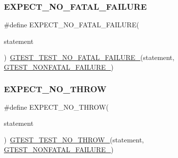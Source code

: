 \subsubsection{\texorpdfstring{EXPECT\_NO\_FATAL\_FAILURE}{EXPECT\_NO\_FATAL\_FAILURE}}
{\footnotesize\ttfamily \#define E\+X\+P\+E\+C\+T\+\_\+\+N\+O\+\_\+\+F\+A\+T\+A\+L\+\_\+\+F\+A\+I\+L\+U\+RE(\begin{DoxyParamCaption}\item[{}]{statement }\end{DoxyParamCaption})~\mbox{\hyperlink{_obj__test_2lib_2googletest-release-1_88_81_2googletest_2include_2gtest_2internal_2gtest-internal_8h_a1b37a3c446836d33040f3266a6236081}{G\+T\+E\+S\+T\+\_\+\+T\+E\+S\+T\+\_\+\+N\+O\+\_\+\+F\+A\+T\+A\+L\+\_\+\+F\+A\+I\+L\+U\+R\+E\+\_\+}}(statement, \mbox{\hyperlink{_obj__test_2lib_2googletest-release-1_88_81_2googletest_2include_2gtest_2internal_2gtest-internal_8h_a6cb7482cfa03661a91c698eb5895f642}{G\+T\+E\+S\+T\+\_\+\+N\+O\+N\+F\+A\+T\+A\+L\+\_\+\+F\+A\+I\+L\+U\+R\+E\+\_\+}})}

\mbox{\label{_obj__test_2lib_2googletest-master_2googletest_2include_2gtest_2gtest_8h_a2743a1438137ad857aa3f9fec3ff67ec}} 
\subsubsection{\texorpdfstring{EXPECT\_NO\_THROW}{EXPECT\_NO\_THROW}}
{\footnotesize\ttfamily \#define E\+X\+P\+E\+C\+T\+\_\+\+N\+O\+\_\+\+T\+H\+R\+OW(\begin{DoxyParamCaption}\item[{}]{statement }\end{DoxyParamCaption})~\mbox{\hyperlink{_obj__test_2lib_2googletest-release-1_88_81_2googletest_2include_2gtest_2internal_2gtest-internal_8h_a9a109d026b5a904646437d7570e13581}{G\+T\+E\+S\+T\+\_\+\+T\+E\+S\+T\+\_\+\+N\+O\+\_\+\+T\+H\+R\+O\+W\+\_\+}}(statement, \mbox{\hyperlink{_obj__test_2lib_2googletest-release-1_88_81_2googletest_2include_2gtest_2internal_2gtest-internal_8h_a6cb7482cfa03661a91c698eb5895f642}{G\+T\+E\+S\+T\+\_\+\+N\+O\+N\+F\+A\+T\+A\+L\+\_\+\+F\+A\+I\+L\+U\+R\+E\+\_\+}})}

\mbox{\label{_obj__test_2lib_2googletest-master_2googletest_2include_2gtest_2gtest_8h_a740cab7e3eec5c178a64b4f558bde66e}} 
